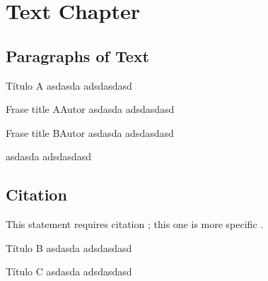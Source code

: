 
\chapter{Text Chapter}


\section{Paragraphs of Text}

\lipsum[1] %

\begin{informationbox}{Título A}
asdasda
\lipsum[1] 
adsdasdasd
\end{informationbox}
\lipsum[1] %


\begin{frasebox}{Frase title A}{Autor}
asdasda
\lipsum[1] 
adsdasdasd
\end{frasebox}

\begin{frasebox}{Frase title B}{Autor}
asdasda
\lipsum[1] 
adsdasdasd
\end{frasebox}

\lipsum[1] %
\begin{citando}
asdasda
\lipsum[1] 
adsdasdasd
\end{citando}


\section{Citation}

This statement requires citation \cite{book_key}; this one is more specific \cite[122]{article_key}.


\lipsum[1-2] %

\begin{informationbox}{Título B}
asdasda
\lipsum[1] 
adsdasdasd
\end{informationbox}


\lipsum[1-2] %
\begin{elaborationbox}{Título C}
asdasda
\lipsum[1] 
adsdasdasd
\end{elaborationbox}


